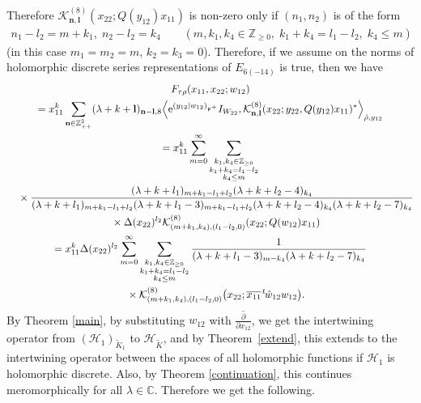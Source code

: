 \documentclass[pdftex]{sigma}
\numberwithin{equation}{section}
\newcommand{\bl}{\mathbf{l}}
\newcommand{\bn}{\mathbf{n}}
\newcommand{\BZ}{\mathbb{Z}}
\newcommand{\BC}{\mathbb{C}}
\newcommand{\fp}{\mathfrak{p}}
\newcommand{\cH}{\mathcal{H}}
\newcommand{\cK}{\mathcal{K}}
\begin{document}
Therefore $\cK_{\bn,\bl}^{(8)}(x_{22};Q(y_{12})x_{11})$ is non-zero only if $(n_1,n_2)$ is of the form
\begin{gather*} n_1-l_2=m+k_1,\; n_2-l_2=k_4 \qquad (m,k_1,k_4\in\BZ_{\ge 0},\; k_1+k_4=l_1-l_2,\; k_4\le m) \end{gather*}
(in this case $m_1=m_2=m$, $k_2=k_3=0$).
Therefore, if we assume \cite[Conjecture 5.11]{N2} on the norms of holomorphic discrete series representations of $E_{6(-14)}$ is true,
then we have
\begin{gather*}
 F_{\tau\rho}(x_{11},x_{22};w_{12}) \\
 =x_{11}^k\sum_{\bn\in\BZ_{++}^{2}}(\lambda+k+\bl)_{\bn-\bl,8}\Bigl\langle {\rm e}^{(y_{12}|w_{12})_{\fp^+}}I_{W_{22}},
\cK_{\bn,\bl}^{(8)}(x_{22};y_{22},Q(y_{12})x_{11})^*\Bigr\rangle_{\hat{\rho},y_{12}} \\
=x_{11}^k\sum_{m=0}^\infty \sum_{\substack{k_1,k_4\in\BZ_{\ge 0}\\ k_1+k_4=l_1-l_2\\ k_4\le m}} \\
\quad{}\times\frac{(\lambda+k+l_1)_{m+k_1-l_1+l_2}(\lambda+k+l_2-4)_{k_4}}
{(\lambda+k+l_1)_{m+k_1-l_1+l_2}(\lambda+k+l_1-3)_{m+k_1-l_1+l_2}(\lambda+k+l_2-4)_{k_4}(\lambda+k+l_2-7)_{k_4}}\\
\quad{} \times \Delta(x_{22})^{l_2}\cK_{(m+k_1,k_4),(l_1-l_2,0)}^{(8)} (x_{22};Q(w_{12})x_{11} )\\
=x_{11}^k\Delta(x_{22})^{l_2}\sum_{m=0}^\infty \sum_{\substack{k_1,k_4\in\BZ_{\ge 0}\\ k_1+k_4=l_1-l_2\\ k_4\le m}}
\frac{1}{(\lambda+k+l_1-3)_{m-k_4}(\lambda+k+l_2-7)_{k_4}} \\
\quad{} \times \cK_{(m+k_1,k_4),(l_1-l_2,0)}^{(8)}
\big(x_{22};\overline{x_{11}}\hspace{1pt}{}^t\hspace{-1pt}\hat{w}_{12}w_{12}\big).
\end{gather*}
By Theorem \ref{main}, by substituting $w_{12}$ with $\overline{\frac{\partial}{\partial x_{12}}}$,
we get the intertwining operator from $(\cH_1)_{\tilde{K}_1}$ to $\cH_{\tilde{K}}$, and by Theorem~\ref{extend},
this extends to the intertwining operator between the spaces of all holomorphic functions if $\cH_1$ is holomorphic discrete.
Also, by Theorem \ref{continuation}, this continues meromorphically for all $\lambda\in\BC$.
Therefore we get the following.
\end{document}
